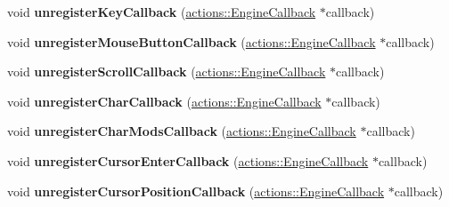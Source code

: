 \begin{DoxyCompactItemize}
\item 
\hypertarget{classfillwave_1_1Engine_a968d602d19efb22437785f6f02e5b443}{}void {\bfseries unregister\+Key\+Callback} (\hyperlink{classfillwave_1_1actions_1_1EngineCallback}{actions\+::\+Engine\+Callback} $\ast$callback)\label{classfillwave_1_1Engine_a968d602d19efb22437785f6f02e5b443}

\item 
\hypertarget{classfillwave_1_1Engine_abc88a56c69f1cc61ecf6595eceaefee3}{}void {\bfseries unregister\+Mouse\+Button\+Callback} (\hyperlink{classfillwave_1_1actions_1_1EngineCallback}{actions\+::\+Engine\+Callback} $\ast$callback)\label{classfillwave_1_1Engine_abc88a56c69f1cc61ecf6595eceaefee3}

\item 
\hypertarget{classfillwave_1_1Engine_a8ea4a2c2f01264900ba83ba34793cbb6}{}void {\bfseries unregister\+Scroll\+Callback} (\hyperlink{classfillwave_1_1actions_1_1EngineCallback}{actions\+::\+Engine\+Callback} $\ast$callback)\label{classfillwave_1_1Engine_a8ea4a2c2f01264900ba83ba34793cbb6}

\item 
\hypertarget{classfillwave_1_1Engine_aaa2bd3c27bae270db09659340516e28d}{}void {\bfseries unregister\+Char\+Callback} (\hyperlink{classfillwave_1_1actions_1_1EngineCallback}{actions\+::\+Engine\+Callback} $\ast$callback)\label{classfillwave_1_1Engine_aaa2bd3c27bae270db09659340516e28d}

\item 
\hypertarget{classfillwave_1_1Engine_a40443d71d58c2020cd0d58cf7d3d8ca7}{}void {\bfseries unregister\+Char\+Mods\+Callback} (\hyperlink{classfillwave_1_1actions_1_1EngineCallback}{actions\+::\+Engine\+Callback} $\ast$callback)\label{classfillwave_1_1Engine_a40443d71d58c2020cd0d58cf7d3d8ca7}

\item 
\hypertarget{classfillwave_1_1Engine_a0f471e0ff7fb90cebec3a2d81af7365f}{}void {\bfseries unregister\+Cursor\+Enter\+Callback} (\hyperlink{classfillwave_1_1actions_1_1EngineCallback}{actions\+::\+Engine\+Callback} $\ast$callback)\label{classfillwave_1_1Engine_a0f471e0ff7fb90cebec3a2d81af7365f}

\item 
\hypertarget{classfillwave_1_1Engine_a47a41a96d50cd7ba94507ffd2e1464bd}{}void {\bfseries unregister\+Cursor\+Position\+Callback} (\hyperlink{classfillwave_1_1actions_1_1EngineCallback}{actions\+::\+Engine\+Callback} $\ast$callback)\label{classfillwave_1_1Engine_a47a41a96d50cd7ba94507ffd2e1464bd}


\end{DoxyCompactItemize}
